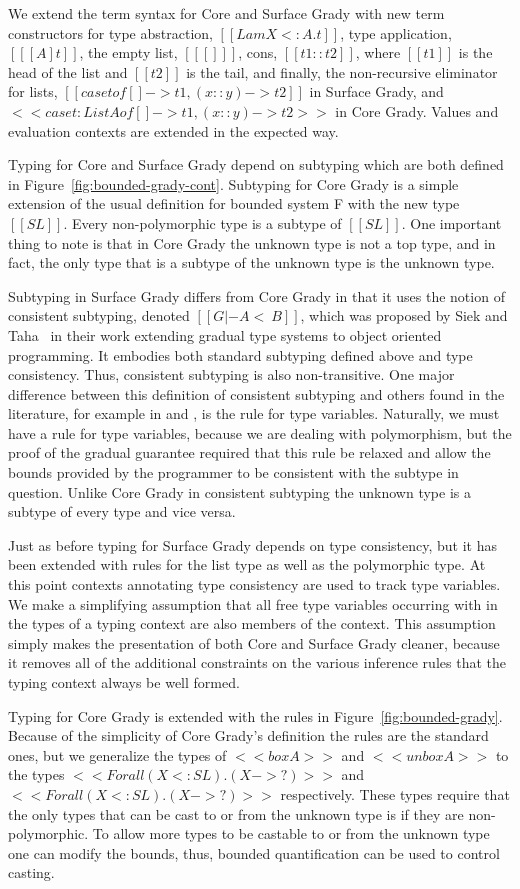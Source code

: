 We extend the term syntax for Core and Surface Grady with new term
constructors for type abstraction, $[[Lam X <: A.t]]$, type
application, $[[ [A]t ]]$, the empty list, $[[ [] ]]$, cons, $[[ t1 ::
    t2 ]]$, where $[[t1]]$ is the head of the list and $[[t2]]$ is the
tail, and finally, the non-recursive eliminator for lists, $[[case t
    of [] -> t1, (x :: y) -> t2]]$ in Surface Grady, and
$<<case t : List A of [] -> t1, (x :: y) -> t2>>$ in Core Grady.
Values and evaluation contexts are extended in the expected way.

Typing for Core and Surface Grady depend on subtyping which are both
defined in Figure~\ref{fig:bounded-grady-cont}.  Subtyping for Core
Grady is a simple extension of the usual definition for bounded system
F \cite{Pierce:2002:TPL:509043} with the new type $[[SL]]$.  Every
non-polymorphic type is a subtype of $[[SL]]$.  One important thing to
note is that in Core Grady the unknown type is not a top type, and in
fact, the only type that is a subtype of the unknown type is the
unknown type.

Subtyping in Surface Grady differs from Core Grady in that it uses the
notion of consistent subtyping, denoted $[[G |- A <~ B]]$, which was
proposed by Siek and Taha~\cite{Siek:2007} in their work extending
gradual type systems to object oriented programming.  It embodies both
standard subtyping defined above and type consistency.  Thus,
consistent subtyping is also non-transitive.  One major difference
between this definition of consistent subtyping and others found in
the literature, for example in \cite{Siek:2007} and
\cite{Garcia:2016}, is the rule for type variables.  Naturally, we
must have a rule for type variables, because we are dealing with
polymorphism, but the proof of the gradual guarantee required that
this rule be relaxed and allow the bounds provided by the programmer
to be consistent with the subtype in question.  Unlike Core Grady in
consistent subtyping the unknown type is a subtype of every type and
vice versa.

Just as before typing for Surface Grady depends on type consistency,
but it has been extended with rules for the list type as well as the
polymorphic type.  At this point contexts annotating type consistency
are used to track type variables.  We make a simplifying assumption
that all free type variables occurring with in the types of a typing
context are also members of the context.  This assumption simply makes
the presentation of both Core and Surface Grady cleaner, because it
removes all of the additional constraints on the various inference
rules that the typing context always be well formed.

Typing for Core Grady is extended with the rules in
Figure~\ref{fig:bounded-grady}.  Because of the simplicity of Core
Grady's definition the rules are the standard ones, but we generalize
the types of $<<box A>>$ and $<<unbox A>>$ to the types $<<Forall (X
<: SL).(X -> ?)>>$ and $<<Forall (X <: SL).(X -> ?)>>$ respectively.
These types require that the only types that can be cast to or from
the unknown type is if they are non-polymorphic.  To allow more types
to be castable to or from the unknown type one can modify the bounds,
thus, bounded quantification can be used to control casting.
